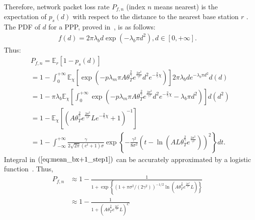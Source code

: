 Therefore, network packet loss rate $P_{f,n}$ (index $n$ means nearest) is the expectation of $p_s(d)$ with respect to the distance to the nearest base station $r$ . The PDF of $d$ for a PPP, proved in~\cite{andrews2011tractable}, is as follows:
\begin{align}
\label{eq:pdf_nearest_distance}
f\left( d \right)  = 2 \pi \lambda_b  d \exp(-\lambda_b \pi d^2), d\in \left[ 0, +\infty\right]. 
\end{align}
Thus:
\begin{align}
\label{eq:mean_bx+1_step1}
&P_{f,n}= \mathbb{E}_{r}\left[ 1-p_{s}\left(d\right) \right]  \nonumber\\
&= 1 -\int_{0}^{+\infty} \mathbb{E}_{\chi} \left[ \exp(-p \lambda_{m} \pi A \theta_{T}^{\frac{2}{\gamma}} e^{\frac{2\sigma^2}{\gamma^2}}  d^2 e^{-\frac{2}{\gamma}\chi}) \right] 2 \pi \lambda_b  d e^{-\lambda_b \pi d^2} d(d) \nonumber\\
&= 1-\pi \lambda_b \mathbb{E}_{\chi}\left[ \int_{0}^{+\infty} \exp(-p \lambda_{m} \pi A \theta_{T}^{\frac{2}{\gamma}} e^{\frac{2\sigma^2}{\gamma^2}}  d^2 e^{-\frac{2}{\gamma}\chi}-\lambda_b \pi d^2)\right] d(d^2) \nonumber\\
&= 1 -\mathbb{E}_{\chi}\left[\left( A \theta_{T}^{\frac{2}{\gamma}} e^{\frac{2\sigma^2}{\gamma^2}} L  e^{-\frac{2}{\gamma}\chi}+1 \right)^{-1} \right] \nonumber\\
&= 1 - \int_{-\infty}^{+\infty} \!\!\! \frac{\gamma}{ 2\sqrt{2\pi}\left( e^t+1\right)\sigma} \exp \left\lbrace -\frac{\gamma^2}{8 \sigma^2} \left(    t-\ln(A L \theta_{T}^{\frac{2}{\gamma}} e^{\!\! \frac{2\sigma^2}{\gamma^2}} )   \right) ^2 \right\rbrace dt.  
\end{align}
Integral in $(\ref{eq:mean_bx+1_step1})$ can be accurately approximated by a logistic function~\cite{crooks2009logistic}. Thus,
\begin{align}
\label{eq:bs_nst_att_analytical}
P_{f,n} 
&\approx 1 - \frac{1}{1 + \exp\left\lbrace \left( 1 +\pi \sigma^2 / (2\gamma^2) \right)^{-1/2} \ln( A \theta_{T}^{\frac{2}{\gamma}} e^{\frac{2\sigma^2}{\gamma^2}}  L) \right\rbrace}  \nonumber\\
&\approx 1-\frac{ 1 }{ 1 + \left( A \theta_{T}^{\frac{2}{\gamma}} e^{\frac{2\sigma^2}{\gamma^2}}  L\right) ^{C} }
\end{align}
